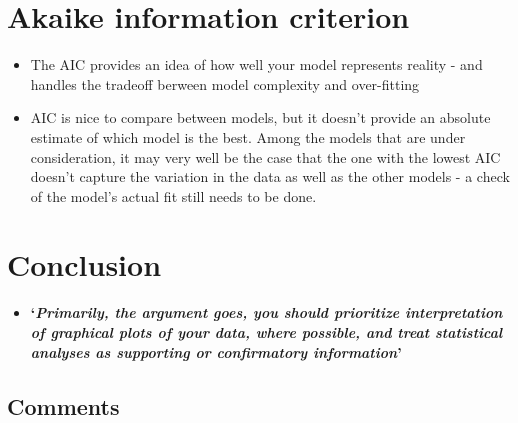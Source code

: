 \documentclass[
]{book}
\providecommand{\tightlist}{%
  \setlength{\itemsep}{0pt}\setlength{\parskip}{0pt}}
\begin{document}
\hypertarget{akaike-information-criterion}{%
\section{Akaike information criterion}\label{akaike-information-criterion}}

\begin{itemize}
\tightlist
\item
  The AIC provides an idea of how well your model represents reality - and handles the tradeoff berween model complexity and over-fitting
\item
  AIC is nice to compare between models, but it doesn't provide an absolute estimate of which model is the best. Among the models that are under consideration, it may very well be the case that the one with the lowest AIC doesn't capture the variation in the data as well as the other models - a check of the model's actual fit still needs to be done.
\end{itemize}

\hypertarget{conclusion}{%
\section{Conclusion}\label{conclusion}}

\begin{itemize}
\tightlist
\item
  \textbf{`\emph{Primarily, the argument goes, you should prioritize interpretation of graphical plots of your data, where possible, and treat statistical analyses as supporting or confirmatory information}'}
\end{itemize}

\hypertarget{comments-5}{%
\subsection{Comments}\label{comments-5}}
\end{document}
